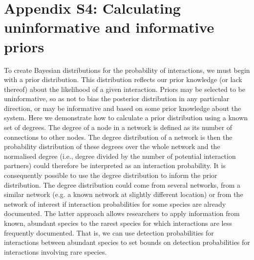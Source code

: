 \documentclass[12pt]{article}
\begin{document}






\clearpage

\section*{Appendix S4: Calculating uninformative and informative priors}

    To create Bayesian distributions for the probability of interactions, we must begin with a prior distribution. This distribution reflects our prior knowledge (or lack thereof) about the likelihood of a given interaction. Priors may be selected to be uninformative, so as not to bias the posterior distribution in any particular direction, or may be informative and based on some prior knowledge about the system. Here we demonstrate how to calculate a prior distribution using a known set of degrees. The degree of a node in a network is defined as its number of connections to other nodes. The degree distribution of a network is then the probability distribution of these degrees over the whole network and the normalised degree (i.e., degree divided by the number of potential interaction partners) could therefore be interpreted as an interaction probability. It is consequently possible to use the degree distribution to inform the prior distribution. The degree distribution could come from several networks, from a similar network (e.g. a known network at slightly different location) or from the network of interest if interaction probabilities for some species are already documented. The latter approach allows researchers to apply information from known, abundant species to the rarest species for which interactions are less frequently documented. That is, we can use detection probabilities for interactions between abundant species to set bounds on detection probabilities for interactions involving rare species.
\end{document}
